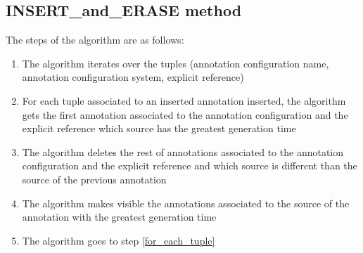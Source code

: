 \subsection {INSERT\_and\_ERASE method}

The steps of the algorithm are as follows:

\begin{enumerate}

\item The algorithm iterates over the tuples (annotation configuration name, annotation configuration system, explicit reference)
\item \label{for_each_tuple} For each tuple associated to an inserted annotation inserted, the algorithm gets the first annotation associated to the annotation configuration and the explicit reference which source has the greatest generation time
\item The algorithm deletes the rest of annotations associated to the annotation configuration and the explicit reference and which source is different than the source of the previous annotation
\item The algorithm makes visible the annotations associated to the source of the annotation with the greatest generation time
\item The algorithm goes to step \ref{for_each_tuple}
\end{enumerate}


